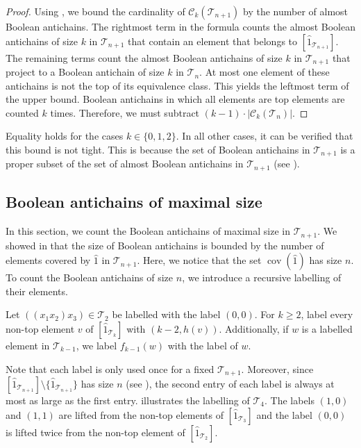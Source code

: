\documentclass{preprint}
\newcommand{\cov}{\operatorname{cov}}
\newcommand{\cC}{\mathcal{C}}
\newcommand{\cT}{\mathcal{T}}
\theoremstyle{definition}
\begin{document}
\begin{proof}
    Using , we bound the cardinality of $\cC_k(\cT_{n+1})$ by the number of almost Boolean antichains.
    The rightmost term in the formula counts the almost Boolean antichains of size $k$ in $\cT_{n+1}$ that contain an element that belongs to $[\hat{1}_{\cT_{n+1}}]$. The remaining terms count the almost Boolean antichains of size $k$ in $\cT_{n+1}$ that project to a Boolean antichain of size $k$ in $\cT_{n}$. At most one element of these antichains is not the top of its equivalence class. This yields the leftmost term of the upper bound. Boolean antichains in which all elements are top elements are counted $k$ times. Therefore, we must subtract $(k-1) \cdot |\cC_k(\cT_n)|$.
\end{proof}

Equality holds for the cases $k \in \{0,1,2\}$. In all other cases, it can be verified that this bound is not tight. This is because the set of Boolean antichains in $\cT_{n+1}$ is a proper subset of the set of almost Boolean antichains in $\cT_{n+1}$ (see ).

\subsection{Boolean antichains of maximal size}\label{sec: Maximal size}
In this section, we count the Boolean antichains of maximal size in $\cT_{n+1}$. We showed in  that the size of Boolean antichains is bounded by the number of elements covered by $\hat{1}$ in $\cT_{n+1}$. Here, we notice that the set $\cov(\hat{1})$ has size $n$. To count the Boolean antichains of size $n$, we introduce a recursive labelling of their elements.

\begin{definition}
Let $((x_1x_2)x_3) \in \cT_2$ be labelled with the label $(0,0)$. For $k\geq 2$, label every non-top element $v$ of $[\hat{1}_{\cT_k}]$ with $(k-2,h(v))$. Additionally, if $w$ is a labelled element in $\cT_{k-1}$, we label $f_{k-1}(w)$ with the label of $w$.
\end{definition}

Note that each label is only used once for a fixed $\cT_{n+1}$. Moreover, since $[\hat{1}_{\cT_{n+1}}]\setminus\{\hat{1}_{\cT_{n+1}}\}$ has size $n$ (see ), the second entry of each label is always at most as large as the first entry.  illustrates the labelling of $\cT_4$. The labels $(1,0)$ and $(1,1)$ are lifted from the non-top elements of $[\hat{1}_{\cT_3}]$ and the label $(0,0)$ is lifted twice from the non-top element of $[\hat{1}_{\cT_2}]$.
\end{document}
